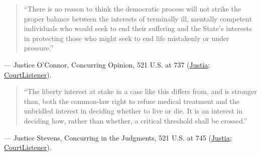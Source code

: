 \documentclass[12pt]{article}
\begin{document}
\begin{quote}
``There is no reason to think the democratic process will not strike the proper balance between the interests of terminally ill, mentally competent individuals who would seek to end their suffering and the State's interests in protecting those who might seek to end life mistakenly or under pressure.''
\end{quote}
\noindent--- Justice O'Connor, Concurring Opinion, 521 U.S. at 737 (\href{https://supreme.justia.com/cases/federal/us/521/702/}{Justia}; \href{https://www.courtlistener.com/opinion/118144/washington-v-glucksberg/}{CourtListener}).

\begin{quote}
``The liberty interest at stake in a case like this differs from, and is stronger than, both the common-law right to refuse medical treatment and the unbridled interest in deciding whether to live or die. It is an interest in deciding how, rather than whether, a critical threshold shall be crossed.''
\end{quote}
\noindent--- Justice Stevens, Concurring in the Judgments, 521 U.S. at 745 (\href{https://supreme.justia.com/cases/federal/us/521/702/}{Justia}; \href{https://www.courtlistener.com/opinion/118144/washington-v-glucksberg/}{CourtListener}).
\end{document}
